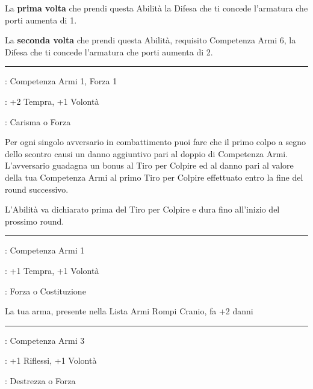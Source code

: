 \begin{multicols}{2}
La \textbf{prima volta} che prendi questa Abilità la Difesa che ti concede l'armatura che porti aumenta di 1.

La \textbf{seconda volta} che prendi questa Abilità, requisito Competenza Armi 6, la Difesa che ti concede l'armatura che porti aumenta di 2.

\smallskip\noindent\rule{\linewidth}{2pt} \hypertarget{La mia morte la tua morte}{}\medskip{}
\noindent
\begin{description}[noitemsep, topsep=0pt, parsep=0pt, partopsep=0pt, leftmargin=0cm, labelwidth=2.5cm]
    \item[\textbf{Requisito}]: Competenza Armi 1, Forza 1

    \item[\textbf{Tiri Salvezza}]: +2 Tempra, +1 Volontà
    \item[\textbf{Caratteristica}]: Carisma o Forza
\end{description}

Per ogni singolo avversario in combattimento puoi fare che il primo colpo a segno dello scontro causi un danno aggiuntivo pari al doppio di Competenza Armi. L'avversario guadagna un bonus al Tiro per Colpire ed al danno pari al valore della tua Competenza Armi al primo Tiro per Colpire effettuato entro la fine del round successivo.

L'Abilità va dichiarato prima del Tiro per Colpire e dura fino all'inizio del prossimo round.

\smallskip\noindent\rule{\linewidth}{2pt} \hypertarget{La mia Testa è più Dura}{}\medskip{}
\noindent
\begin{description}[noitemsep, topsep=0pt, parsep=0pt, partopsep=0pt, leftmargin=0cm, labelwidth=2.5cm]
    \item[\textbf{Requisito}]: Competenza Armi 1
    \item[\textbf{Tiri Salvezza}]: +1 Tempra, +1 Volontà
    \item[\textbf{Caratteristica}]: Forza o Costituzione
\end{description}

La tua arma, presente nella Lista Armi Rompi Cranio, fa +2 danni

\smallskip\noindent\rule{\linewidth}{2pt} \hypertarget{Lesto}{}\medskip{}
\noindent
\begin{description}[noitemsep, topsep=0pt, parsep=0pt, partopsep=0pt, leftmargin=0cm, labelwidth=2.5cm]
    \item[\textbf{Requisito}]: Competenza Armi 3
    \item[\textbf{Tiri Salvezza}]: +1 Riflessi, +1 Volontà
    \item[\textbf{Caratteristica}]: Destrezza o Forza
\end{description}


\end{multicols}
